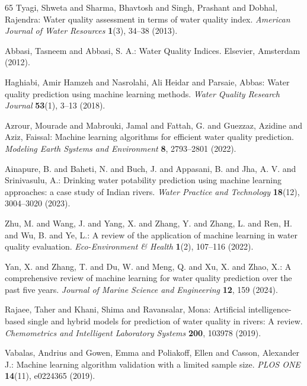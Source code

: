 \documentclass[pdflatex,sn-mathphys-num]{sn-jnl}%
\theoremstyle{thmstyleone}%
\theoremstyle{thmstyletwo}%
\theoremstyle{thmstylethree}%
\begin{document}
\begin{thebibliography}{65}
Tyagi, Shweta and Sharma, Bhavtosh and Singh, Prashant and Dobhal, Rajendra: Water quality assessment in terms of water quality index.
\textit{American Journal of Water Resources} \textbf{1}(3), 34--38 (2013).

Abbasi, Tasneem and Abbasi, S. A.: Water Quality Indices.
Elsevier, Amsterdam (2012).

Haghiabi, Amir Hamzeh and Nasrolahi, Ali Heidar and Parsaie, Abbas: Water quality prediction using machine learning methods.
\textit{Water Quality Research Journal} \textbf{53}(1), 3--13 (2018).

Azrour, Mourade and Mabrouki, Jamal and Fattah, G. and Guezzaz, Azidine and Aziz, Faissal: Machine learning algorithms for efficient water quality prediction.
\textit{Modeling Earth Systems and Environment} \textbf{8}, 2793--2801 (2022).

Ainapure, B. and Baheti, N. and Buch, J. and Appasani, B. and Jha, A. V. and Srinivasulu, A.: Drinking water potability prediction using machine learning approaches: a case study of Indian rivers.
\textit{Water Practice and Technology} \textbf{18}(12), 3004--3020 (2023).

Zhu, M. and Wang, J. and Yang, X. and Zhang, Y. and Zhang, L. and Ren, H. and Wu, B. and Ye, L.: A review of the application of machine learning in water quality evaluation.
\textit{Eco-Environment \& Health} \textbf{1}(2), 107--116 (2022).

Yan, X. and Zhang, T. and Du, W. and Meng, Q. and Xu, X. and Zhao, X.: A comprehensive review of machine learning for water quality prediction over the past five years.
\textit{Journal of Marine Science and Engineering} \textbf{12}, 159 (2024).

Rajaee, Taher and Khani, Shima and Ravansalar, Mona: Artificial intelligence-based single and hybrid models for prediction of water quality in rivers: A review.
\textit{Chemometrics and Intelligent Laboratory Systems} \textbf{200}, 103978 (2019).

Vabalas, Andrius and Gowen, Emma and Poliakoff, Ellen and Casson, Alexander J.: Machine learning algorithm validation with a limited sample size.
\textit{PLOS ONE} \textbf{14}(11), e0224365 (2019).


\end{thebibliography}
\end{document}
